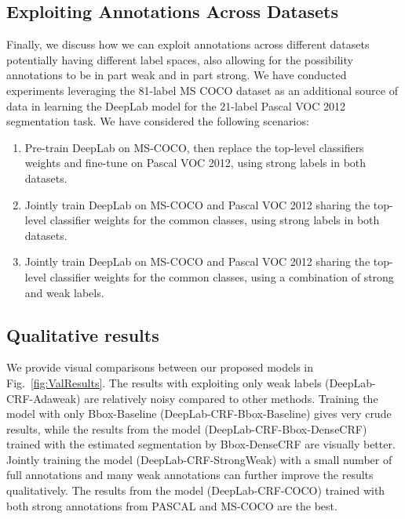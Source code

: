 \subsection{Exploiting Annotations Across Datasets}
\label{sec:cross_dataset}

Finally, we discuss how we can exploit annotations across different
datasets potentially having different label spaces, also allowing for
the possibility annotations to be in part weak and in part strong. We
have conducted experiments leveraging the 81-label MS COCO dataset as
an additional source of data in learning the DeepLab model for the
21-label Pascal VOC 2012 segmentation task. We have considered the
following scenarios:
\begin{enumerate}
\item Pre-train DeepLab on MS-COCO, then replace the top-level
  classifiers weights and fine-tune on Pascal VOC 2012, using strong
  labels in both datasets.
\item Jointly train DeepLab on MS-COCO and Pascal VOC 2012 sharing
  the top-level classifier weights for the common classes, using
  strong labels in both datasets.
\item Jointly train DeepLab on MS-COCO and Pascal VOC 2012 sharing
  the top-level classifier weights for the common classes, using a
  combination of strong and weak labels.
\end{enumerate}

\subsection{Qualitative results} 
\label{sec:test_qualitative}

We provide visual comparisons between our proposed models in
Fig.~\ref{fig:ValResults}. The results with exploiting only weak
labels (DeepLab-CRF-Adaweak) are relatively noisy compared to other
methods. Training the model with only Bbox-Baseline
(DeepLab-CRF-Bbox-Baseline) gives very crude results, while the
results from the model (DeepLab-CRF-Bbox-DenseCRF) trained with the
estimated segmentation by Bbox-DenseCRF are visually better. Jointly
training the model (DeepLab-CRF-StrongWeak) with a small number of
full annotations and many weak annotations can further improve the
results qualitatively. The results from the model (DeepLab-CRF-COCO)
trained with both strong annotations from PASCAL and MS-COCO are the
best.

